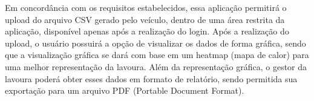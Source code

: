   Em concordância com os requisitos estabelecidos, essa aplicação
  permitirá o upload do arquivo CSV gerado pelo veículo, dentro de
  uma área restrita da aplicação, disponível apenas após a realização
  do login.
  Após a realização do upload, o usuário possuirá a opção de visualizar
  os dados de forma gráfica, sendo que a visualização gráfica se dará
  com base em um heatmap (mapa de calor) para uma melhor representação
  da lavoura.
  Além da representação gráfica, o gestor da lavoura poderá obter
  esses dados em formato de relatório, sendo permitida sua
  exportação para um arquivo PDF (Portable Document Format).

